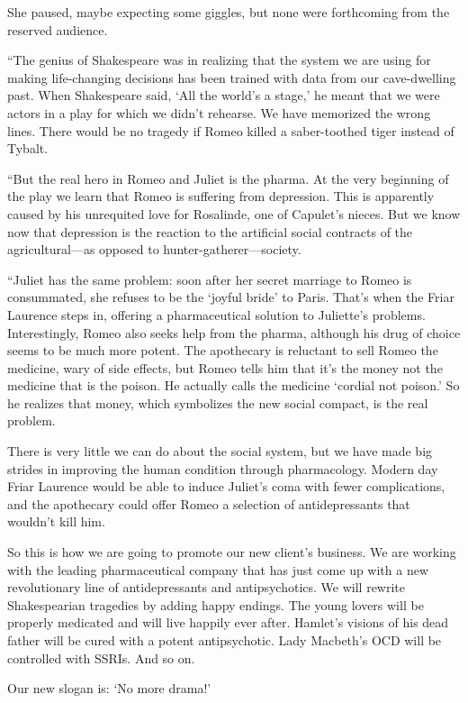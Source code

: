\documentclass{memoir}
\begin{document}
She paused, maybe expecting some giggles, but none were forthcoming from the reserved audience.

``The genius of Shakespeare was in realizing that the system we are using for making life-changing decisions has been trained with data from our cave-dwelling past. When Shakespeare said, `All the world's a stage,' he meant that we were actors in a play for which we didn't rehearse. We have memorized the wrong lines. There would be no tragedy if Romeo killed a saber-toothed tiger instead of Tybalt. 

``But the real hero in Romeo and Juliet is the pharma. At the very beginning of the play we learn that Romeo is suffering from depression. This is apparently caused by his unrequited love for Rosalinde, one of Capulet's nieces. But we know now that depression is the reaction to the artificial social contracts of the agricultural---as opposed to hunter-gatherer---society. 

``Juliet has the same problem: soon after her secret marriage to Romeo is consummated, she refuses to be the `joyful bride' to Paris. That's when the Friar Laurence steps in, offering a pharmaceutical solution to Juliette's problems. Interestingly, Romeo also seeks help from the pharma, although his drug of choice seems to be much more potent. The apothecary is reluctant to sell Romeo the medicine, wary of side effects, but Romeo tells him that it's the money not the medicine that is the poison. He actually calls the medicine `cordial not poison.' So he realizes that money, which symbolizes the new social compact, is the real problem. 

There is very little we can do about the social system, but we have made big strides in improving the human condition through pharmacology. Modern day Friar Laurence would be able to induce Juliet's coma with fewer complications, and the apothecary could offer Romeo a selection of antidepressants that wouldn't kill him. 

So this is how we are going to promote our new client's business. We are working with the leading pharmaceutical company that has just come up with a new revolutionary line of antidepressants and antipsychotics. We will rewrite Shakespearian tragedies by adding happy endings. The young lovers will be properly medicated and will live happily ever after. Hamlet's visions of his dead father will be cured with a potent antipsychotic. Lady Macbeth's OCD will be controlled with SSRIs. And so on. 

Our new slogan is: `No more drama!'
\end{document}
